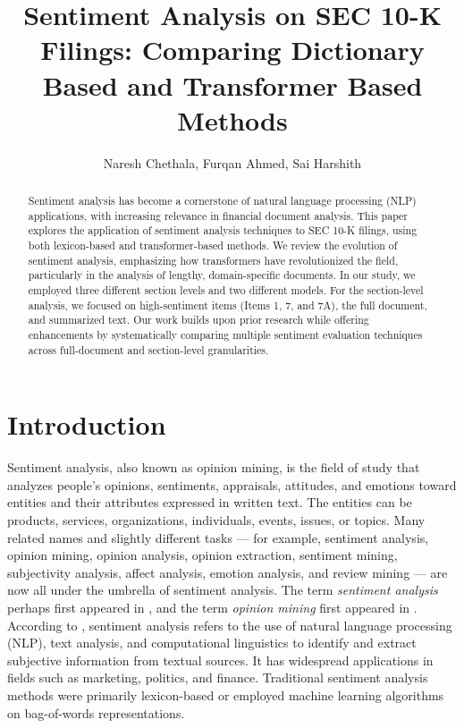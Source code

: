 \documentclass[12pt]{article}
\title{Sentiment Analysis on SEC 10-K Filings: \newline Comparing Dictionary Based and Transformer Based Methods}
\author{Naresh Chethala, Furqan Ahmed, Sai Harshith}
\date{}
\begin{document}
\maketitle

\begin{abstract}
Sentiment analysis has become a cornerstone of natural language processing (NLP) applications, with increasing relevance in financial document analysis. This paper explores the application of sentiment analysis techniques to SEC 10-K filings, using both lexicon-based and transformer-based methods. We review the evolution of sentiment analysis, emphasizing how transformers have revolutionized the field, particularly in the analysis of lengthy, domain-specific documents. In our study, we employed three different section levels and two different models. For the section-level analysis, we focused on high-sentiment items (Items 1, 7, and 7A), the full document, and summarized text. Our work builds upon prior research while offering enhancements by systematically comparing multiple sentiment evaluation techniques across full-document and section-level granularities.
\end{abstract}

\section{Introduction}
Sentiment analysis, also known as opinion mining, is the field of study that analyzes people's opinions, sentiments, appraisals, attitudes, and emotions toward entities and their attributes expressed in written text. The entities can be products, services, organizations, individuals, events, issues, or topics. Many related names and slightly different tasks — for example, sentiment analysis, opinion mining, opinion analysis, opinion extraction, sentiment mining, subjectivity analysis, affect analysis, emotion analysis, and review mining — are now all under the umbrella of sentiment analysis. The term \textit{sentiment analysis} perhaps first appeared in \citep{Nasukawa2003}, and the term \textit{opinion mining} first appeared in \citep{Dave2003}. According to \citet{Pang2008}, sentiment analysis refers to the use of natural language processing (NLP), text analysis, and computational linguistics to identify and extract subjective information from textual sources. It has widespread applications in fields such as marketing, politics, and finance. Traditional sentiment analysis methods were primarily lexicon-based or employed machine learning algorithms on bag-of-words representations.
\end{document}
